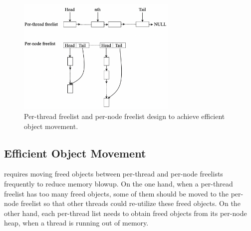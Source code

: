 \begin{figure}[!h]
\centering
\includegraphics[width=3in]{figure/efficient-movement.png}
\caption{Per-thread freelist and per-node freelist design to achieve efficient object movement.\label{fig:perthreadlist}}
\end{figure}

 
 

\subsection{Efficient Object Movement} 
\label{sec:movement}
\NM{} requires moving freed objects between per-thread and per-node freelists frequently to reduce memory blowup. 
On the one hand, when a per-thread freelist has too many freed objects, some of them should be moved to the per-node freelist so that other threads could re-utilize these freed objects. On the other hand, each per-thread list needs to obtain freed objects from its per-node heap, when a thread is running out of memory.

